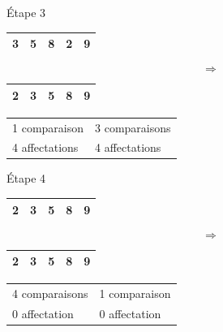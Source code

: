 \documentclass[10pt,fleqn]{article} %
\begin{document}
\begin{minipage}[b]{.07\linewidth}
Étape 3
\end{minipage}\hfill
\begin{minipage}[b]{.15\linewidth}
\begin{tabular}{|c|c|c|c|c|}
\hline
\cellcolor{black!10}3 & \cellcolor{black!10}5 & \cellcolor{black!10}8 & \cellcolor{black!30}2 & 9 \\
\hline
\end{tabular}
\end{minipage}\hfill
\begin{minipage}[b]{.05\linewidth}
$$
\Longrightarrow
$$
\end{minipage}\hfill
\begin{minipage}[b]{.15\linewidth}
\begin{tabular}{|c|c|c|c|c|}
\hline
\cellcolor{black!30}2 & \cellcolor{black!10}3 & \cellcolor{black!10}5 & \cellcolor{black!10}8 & 9 \\
\hline
\end{tabular}
\end{minipage}\hfill
\begin{minipage}[b]{.3\linewidth}
\begin{tabular}{ll}
1 comparaison & 3 comparaisons \\
4 affectations & 4 affectations \\
\end{tabular}
\end{minipage}


\begin{minipage}[b]{.07\linewidth}
Étape 4
\end{minipage}\hfill
\begin{minipage}[b]{.15\linewidth}
\begin{tabular}{|c|c|c|c|c|}
\hline
\cellcolor{black!10}2 & \cellcolor{black!10}3 & \cellcolor{black!10}5 & \cellcolor{black!10}8 & \cellcolor{black!30}9 \\
\hline
\end{tabular}
\end{minipage}\hfill
\begin{minipage}[b]{.05\linewidth}
$$
\Longrightarrow
$$
\end{minipage}\hfill
\begin{minipage}[b]{.15\linewidth}
\begin{tabular}{|c|c|c|c|c|}
\hline
\cellcolor{black!10}2 & \cellcolor{black!10}3 & \cellcolor{black!10}5 & \cellcolor{black!10}8 & \cellcolor{black!30}9 \\
\hline
\end{tabular}
\end{minipage}\hfill
\begin{minipage}[b]{.3\linewidth}
\begin{tabular}{ll}
4 comparaisons & 1 comparaison \\
0 affectation & 0 affectation \\
\end{tabular}
\end{minipage}
\end{document}
